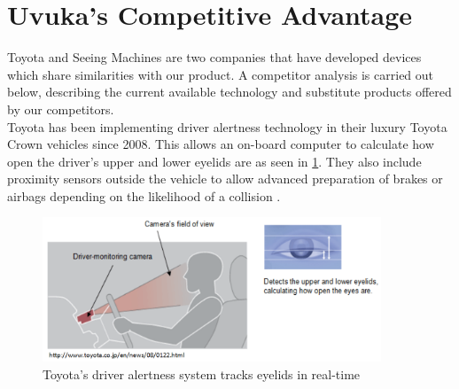 \section{Uvuka's Competitive Advantage}
\label{sec:advantages}
Toyota and Seeing Machines are two companies that have developed devices which share similarities with our product. A competitor analysis is carried out below, describing the current available technology and substitute products offered by our competitors.\\

Toyota has been implementing driver alertness technology in their luxury Toyota Crown vehicles since 2008. This allows an on-board computer to calculate how open the driver's upper and lower eyelids are as seen in \cref{fig:toyota_sensors}. They also include proximity sensors outside the vehicle to allow advanced preparation of brakes or airbags depending on the likelihood of a collision \cite{toyota}. 
\newpage
\begin{figure}[H]
\centering
\includegraphics[width=0.9\textwidth]{images/toyota.PNG}
\vskip10pt
\caption[Toyota driver alertness system]{Toyota's driver alertness system tracks eyelids in real-time \cite{toyota}}
\label{fig:toyota_sensors}
\end{figure}

